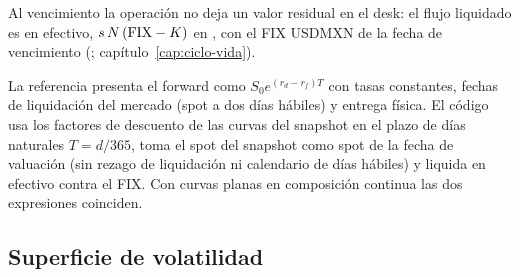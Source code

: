 Al vencimiento la operación no deja un valor residual en el desk: el flujo liquidado es en efectivo,
$s\,N\,(\mathrm{FIX}-K)$ en \MXN{}, con el FIX USDMXN de la fecha de vencimiento
(; capítulo~\ref{cap:ciclo-vida}).

\begin{diferencia}
  La referencia \citep{hull2018} presenta el forward como $S_0e^{(r_d-r_f)T}$ con tasas constantes, fechas de
  liquidación del mercado (spot a dos días hábiles) y entrega física. El código usa los factores de
  descuento de las curvas del snapshot en el plazo de días naturales $T=d/365$, toma el spot del snapshot como
  spot de la fecha de valuación (sin rezago de liquidación ni calendario de días hábiles) y liquida en efectivo
  contra el FIX. Con curvas planas en composición continua las dos expresiones coinciden.
\end{diferencia}

\subsection{Superficie de volatilidad}\label{sec:cap04-superficie}

